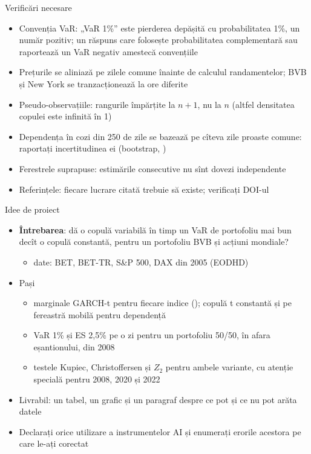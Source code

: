 \begin{frame}{Verificări necesare}
\itemsize{\small}
\begin{itemize}
    \item Convenția VaR: „VaR 1\%” este pierderea depășită cu probabilitatea 1\%, un număr pozitiv; un răspuns care folosește probabilitatea complementară sau raportează un VaR negativ amestecă convențiile
    \item Prețurile se aliniază pe zilele comune înainte de calculul randamentelor; BVB și New York se tranzacționează la ore diferite
    \item Pseudo-observațiile: rangurile împărțite la $n + 1$, nu la $n$ (altfel densitatea copulei este infinită în 1)
    \item Dependența în cozi din 250 de zile se bazează pe cîteva zile proaste comune: raportați incertitudinea ei (bootstrap, )
    \item Ferestrele suprapuse: estimările consecutive nu sînt dovezi independente
    \item Referințele: fiecare lucrare citată trebuie să existe; verificați DOI-ul
\end{itemize}
\end{frame}

\begin{frame}{Idee de proiect}
\itemsize{\small}
\begin{itemize}
    \item \textbf{Întrebarea}: dă o copulă variabilă în timp un VaR de portofoliu mai bun decît o copulă constantă, pentru un portofoliu BVB și acțiuni mondiale?
    \begin{itemize}
        \item date: BET, BET-TR, S\&P 500, DAX din 2005 (EODHD)
    \end{itemize}
    \item Pași
    \begin{itemize}
        \item marginale GARCH-t pentru fiecare indice (); copulă t constantă și pe fereastră mobilă pentru dependență
        \item VaR 1\% și ES 2,5\% pe o zi pentru un portofoliu 50/50, în afara eșantionului, din 2008
        \item testele Kupiec, Christoffersen și $Z_2$ pentru ambele variante, cu atenție specială pentru 2008, 2020 și 2022
    \end{itemize}
    \item Livrabil: un tabel, un grafic și un paragraf despre ce pot și ce nu pot arăta datele
    \item Declarați orice utilizare a instrumentelor AI și enumerați erorile acestora pe care le-ați corectat
\end{itemize}
\end{frame}


